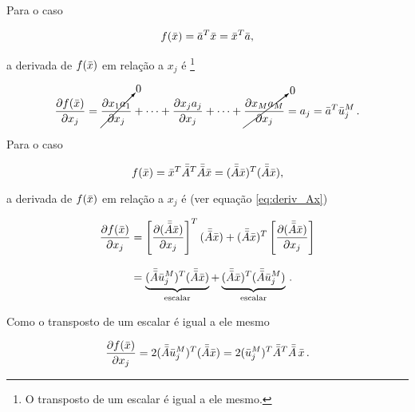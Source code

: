 \begin{example}
    Para o caso

    \begin{equation}
    f(\bar{x}) = \bar{a}^T\bar{x} = \bar{x}^T\bar{a},
    \end{equation}
    
    \noindent a derivada de $f(\bar{x})$ em relação
    a $x_j$ é \footnote{O transposto de um escalar é igual a ele mesmo.}
    
    \begin{equation}
    \dfrac{\partial f(\bar{x})}{\partial x_j} =
        \cancelto{0}{\dfrac{\partial x_1a_1}{\partial x_j}} + \dotsb +
        \dfrac{\partial x_ja_j}{\partial x_j} + \dotsb +
        \cancelto{0}{\dfrac{\partial x_M a_M}{\partial x_j}}
        = a_j = \bar{a}^T \bar{u}_j^M
    \thinspace .
    \label{eq:deriv_aTx}
    \end{equation}
\end{example}

\begin{example}
    Para o caso

    \begin{equation}
    f(\bar{x}) = \bar{x}^T\bar{\bar{A}}^T\bar{\bar{A}}\bar{x} =
        (\bar{\bar{A}}\bar{x})^T(\bar{\bar{A}}\bar{x}),
    \end{equation}
    
    \noindent a derivada de $f(\bar{x})$ em relação
    a $x_j$ é (ver equação \ref{eq:deriv_Ax})
    
    \begin{equation}
    \begin{split}
    \dfrac{\partial f(\bar{x})}{\partial x_j} &=
        \left[\dfrac{\partial(\bar{\bar{A}}\bar{x})}{\partial x_j}\right]^T(\bar{\bar{A}}\bar{x}) +
        (\bar{\bar{A}}\bar{x})^T\left[\dfrac{\partial(\bar{\bar{A}}\bar{x})}{\partial x_j}\right]
    \\[0.3cm]
    &=
    \underbrace{(\bar{\bar{A}}\bar{u}_j^M)^T(\bar{\bar{A}}\bar{x})}_{\text{escalar}} + 
    \underbrace{(\bar{\bar{A}}\bar{x})^T(\bar{\bar{A}}\bar{u}_j^M)}_{\text{escalar}}
    \thinspace .
    \end{split}
    \end{equation}

    \noindent Como o transposto de um escalar é igual a ele mesmo

    \begin{equation}
    \dfrac{\partial f(\bar{x})}{\partial x_j} =
        2(\bar{\bar{A}}\bar{u}_j^M)^T(\bar{\bar{A}}\bar{x}) =
        2(\bar{u}_j^M)^T \bar{\bar{A}}^T\bar{\bar{A}}\thinspace\bar{x}
    \thinspace .
    \label{eq:deriv_xTATAx}
    \end{equation}    
\end{example}


